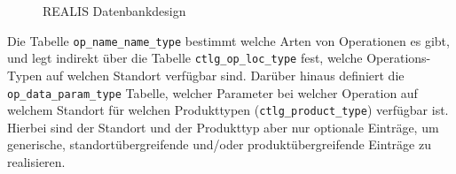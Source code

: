 \begin{figure}[!htbp]
    \centering
    \caption{REALIS Datenbankdesign}
    \label{fig:realis-datenbankdesign}
\end{figure}

Die Tabelle \texttt{op\_name\_name\_type} bestimmt welche Arten von Operationen es gibt, und legt indirekt über die Tabelle \texttt{ctlg\_op\_loc\_type} fest, welche Operations-Typen auf welchen Standort verfügbar sind. Darüber hinaus definiert die 
\texttt{op\_data\_param\_type} Tabelle, welcher Parameter bei welcher Operation auf welchem Standort für welchen Produkttypen (\texttt{ctlg\_product\_type}) verfügbar ist. Hierbei sind der Standort und der Produkttyp aber nur optionale Einträge, um generische, standortübergreifende und/oder produktübergreifende Einträge zu realisieren.

